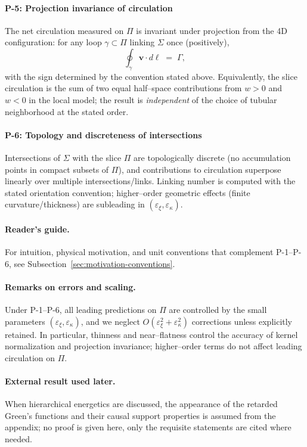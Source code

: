 \paragraph{P-5: Projection invariance of circulation}
\label{post:P5}
The net circulation measured on $\Pi$ is invariant under projection from the 4D configuration: for any loop $\gamma\subset\Pi$ linking $\Sigma$ once (positively),
\[
\oint_{\gamma}\mathbf{v}\cdot d\boldsymbol{\ell}\;=\;\Gamma,
\]
with the sign determined by the convention stated above. Equivalently, the slice circulation is the sum of two equal half–space contributions from $w>0$ and $w<0$ in the local model; the result is \emph{independent} of the choice of tubular neighborhood at the stated order.

\paragraph{P-6: Topology and discreteness of intersections}
\label{post:P6}
Intersections of $\Sigma$ with the slice $\Pi$ are topologically discrete (no accumulation points in compact subsets of $\Pi$), and contributions to circulation superpose linearly over multiple intersections/links. Linking number is computed with the stated orientation convention; higher–order geometric effects (finite curvature/thickness) are subleading in $(\varepsilon_\xi,\varepsilon_\kappa)$.

\paragraph{Reader's guide.}
For intuition, physical motivation, and unit conventions that complement P-1–P-6, see Subsection~\ref{sec:motivation-conventions}.

\paragraph{Remarks on errors and scaling.}
Under P-1–P-6, all leading predictions on $\Pi$ are controlled by the small parameters $(\varepsilon_\xi,\varepsilon_\kappa)$, and we neglect $O(\varepsilon_\xi^2+\varepsilon_\kappa^2)$ corrections unless explicitly retained. In particular, thinness and near–flatness control the accuracy of kernel normalization and projection invariance; higher–order terms do not affect leading circulation on $\Pi$.

\paragraph{External result used later.}
When hierarchical energetics are discussed, the appearance of the retarded Green's functions and their causal support properties is assumed from the appendix; no proof is given here, only the requisite statements are cited where needed.

